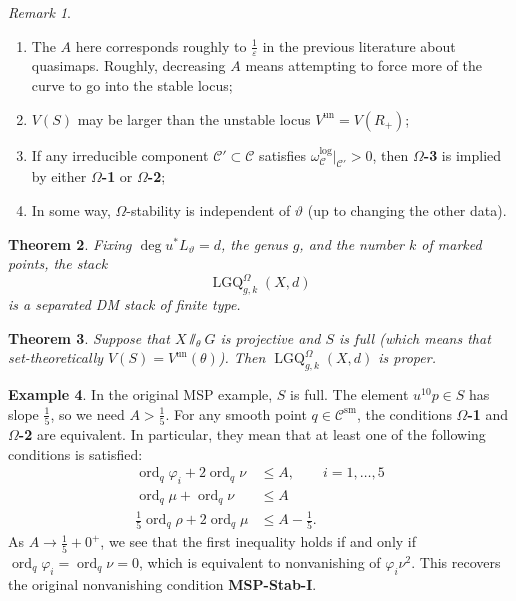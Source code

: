 \documentclass[10pt,oldfontcommands,oneside]{memoir}
\newtheorem{thm}{Theorem}[section]
\theoremstyle{definition}
\newtheorem{exm}[thm]{Example}
\theoremstyle{remark}
\newtheorem{rmk}[thm]{Remark}
\theoremstyle{plain}
\theoremstyle{definition}
\theoremstyle{remark}
\newcommand{\ep}{\varepsilon}
\newcommand{\mc}[1]{\mathcal{#1}}
\newcommand{\mr}[1]{\mathrm{#1}}
\newcommand{\on}[1]{\operatorname{#1}}
\newcommand{\1}{\mathbf{1}}
\newcommand{\2}{\mathbf{2}}
\newcommand{\3}{\mathbf{3}}
\begin{document}
\begin{rmk}\leavevmode
    \begin{enumerate}
        \item The $A$ here corresponds roughly to $\frac{1}{\ep}$ in the previous literature about quasimaps. Roughly, decreasing $A$ means attempting to force more of the curve to go into the stable locus;
        \item $V(S)$ may be larger than the unstable locus $V^{\on{un}} = V(R_+)$;
        \item If any irreducible component $\mc{C}' \subset \mc{C}$ satisfies $\omega_{\mc{C}}^{\log}|_{\mc{C}'} > 0$, then \textbf{$\Omega$-3} is implied by either \textbf{$\Omega$-1} or \textbf{$\Omega$-2};
        \item In some way, $\Omega$-stability is independent of $\vartheta$ (up to changing the other data).
    \end{enumerate}
\end{rmk}

\begin{thm}
    Fixing $\deg u^*L_{\vartheta} = d$, the genus $g$, and the number $k$ of marked points, the stack
    \[ \on{LGQ}^{\Omega}_{g,k}(X,d) \]
    is a separated DM stack of finite type.
\end{thm}

\begin{thm}
    Suppose that $X \sslash_{\theta} G$ is projective and $S$ is \textit{full} (which means that set-theoretically $V(S) = V^{\on{un}}(\theta)$). Then $\on{LGQ}^{\Omega}_{g,k}(X,d)$ is proper.
\end{thm}

\begin{exm}
    In the original MSP example, $S$ is full. The element $u^{10}p \in S$ has slope $\frac{1}{5}$, so we need $A > \frac{1}{5}$. For any smooth point $q \in \mc{C}^{\mr{sm}}$, the conditions \textbf{$\Omega$-1} and \textbf{$\Omega$-2} are equivalent. In particular, they mean that at least one of the following conditions is satisfied:
    \begin{align*}
        \on{ord}_q \varphi_i + 2 \on{ord}_q \nu &\leq A, \qquad i = 1,\ldots,5 \\
        \on{ord}_q \mu + \on{ord}_q \nu &\leq A \\
        \frac{1}{5} \on{ord}_q \rho + 2 \on{ord}_q \mu &\leq A - \frac{1}{5}.
    \end{align*}
    As $A \to \frac{1}{5} + 0^+$, we see that the first inequality holds if and only if $\on{ord}_q \varphi_i = \on{ord}_q \nu = 0$, which is equivalent to nonvanishing of $\varphi_i \nu^2$. This recovers the original nonvanishing condition \textbf{MSP-Stab-I}.
\end{exm}
\end{document}
